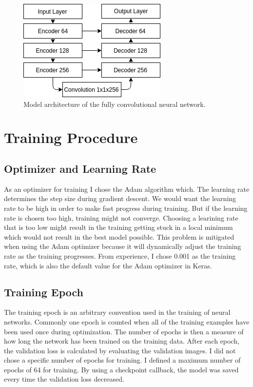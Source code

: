 \documentclass[twoside, twocolumn]{article}
\begin{document}
\begin{figure}[ht]
\centering
\includegraphics[width=0.75\columnwidth]{fig/model_alt.png}
\caption{\label{fig:model} Model architecture of the fully convolutional neural network.}
\end{figure}

\section{Training Procedure}
\subsection{Optimizer and Learning Rate}
As an optimizer for training I chose the Adam algorithm which. The learning
rate determines the step size during gradient descent. We would want the learning
rate to be high in order to make fast progress during training. But if the
learning rate is chosen too high, training might not converge. Choosing a learining
rate that is too low might result in the training getting stuck in a local
minimum which would not result in the best model possible. This problem is mitigated
when using the Adam optimizer because it will dynamically adjust the training rate
as the training progresses. From experience, I chose 0.001 as the training rate, which
is also the default value for the Adam optimizer in Keras.

\subsection{Training Epoch}
The training epoch is an arbitrary convention used in the training of neural networks.
Commonly one epoch is counted when all of the training examples have been used
once during optimization. The number of epochs is then a measure of how long
the network has been trained on the training data. After each epoch, the
validation loss is calculated by evaluating the validation images. I did not chose
a specific number of epochs for training. I defined a maximum number of epochs
of 64 for training. By using a checkpoint callback, the model was saved every time
the validation loss decreased.
\end{document}

